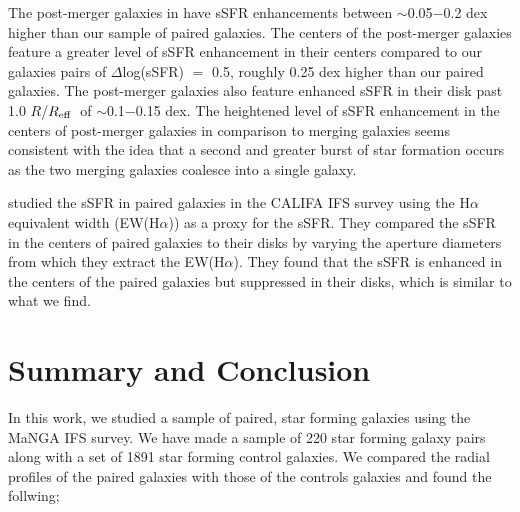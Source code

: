 \documentclass[iop,revtex4,twocolumn,apj,numberedappendix,appendixfloats]{emulateapj}
\newcommand{\reff}{$R_{\rm eff}$}
\newcommand{\ewha}{EW(H$\alpha$)}
\begin{document}
The post-merger galaxies in \citet{Thorp:2019} have sSFR enhancements between $\sim$0.05$-$0.2 dex higher than our sample of paired galaxies. The centers of the post-merger galaxies feature a greater level of sSFR enhancement in their centers compared to our galaxies pairs of $\Delta$log(sSFR) $=$ 0.5, roughly 0.25 dex higher than our paired galaxies. The post-merger galaxies also feature enhanced sSFR in their disk past 1.0 $R$/\reff\ of $\sim$0.1$-$0.15 dex. The heightened level of sSFR enhancement in the centers of post-merger galaxies in comparison to merging galaxies seems consistent with the idea that a second and greater burst of star formation occurs as the two merging galaxies coalesce into a single galaxy. 

\citet{Barrera-Ballesteros:2015} studied the sSFR in paired galaxies in the CALIFA IFS survey using the H$\alpha$ equivalent width (\ewha) as a proxy for the sSFR. They compared the sSFR in the centers of paired galaxies to their disks by varying the aperture diameters from which they extract the \ewha. They found that the sSFR is enhanced in the centers of the paired galaxies but suppressed in their disks, which is similar to what we find.  


\section{Summary and Conclusion}\label{sec:sum}

In this work, we studied a sample of paired, star forming galaxies using the MaNGA IFS survey. We have made a sample of 220 star forming galaxy pairs along with a set of 1891 star forming control galaxies. We compared the radial profiles of the paired galaxies with those of the controls galaxies and found the follwing;
\end{document}
